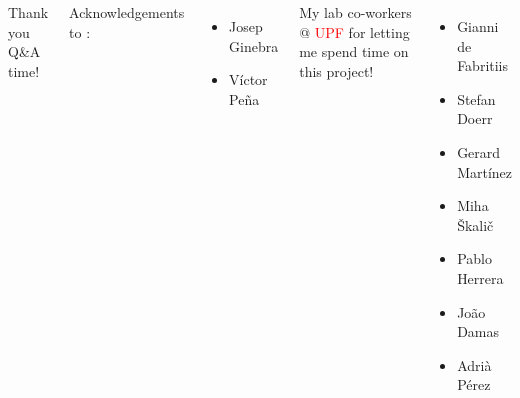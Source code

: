\documentclass[10pt,usenames,dvipsnames]{beamer}
\begin{document}
\begin{frame}[plain,c]
\begin{columns}
\Huge Thank you\\
\Large {Q\&A time!} 
\normalsize
{Acknowledgements to :
\begin{itemize}
\item Josep Ginebra
\item V\'ictor Peña
\end{itemize}
}
My lab co-workers @ \textcolor{red}{UPF} for letting me spend time on this project!
\begin{itemize}
\item Gianni de Fabritiis
\item Stefan Doerr
\item Gerard Mart\'inez
\item Miha \v{S}kali\v{c}
\item Pablo Herrera
\item Jo\~ao Damas
\item Adri\`a P\'erez
\end{itemize}
\end{columns}
\end{frame}
			
			
\end{document}
